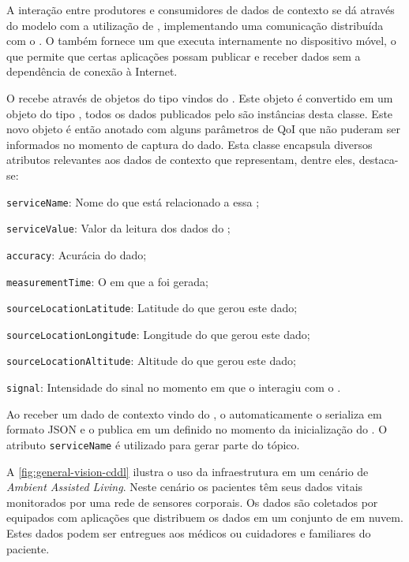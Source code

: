 A interação entre produtores e consumidores de dados de contexto se dá através do modelo \pubsub com a utilização de \brokers, implementando uma comunicação distribuída com o \mqtt. O \cddl também fornece um \ubroker que executa internamente no dispositivo móvel, o que permite que certas aplicações possam publicar e receber dados sem a dependência de conexão à Internet.

O \cddl recebe através de \eventbus objetos do tipo \sensordata vindos do \stwopa.
Este objeto é convertido em um objeto do tipo \msg, todos os dados publicados pelo \cddl são instâncias desta classe.
Este novo objeto é então anotado com alguns parâmetros de QoI que não puderam ser informados no momento de captura do dado.
Esta classe encapsula diversos atributos relevantes aos dados de contexto que representam, dentre eles, destaca-se:

\begin{alineas}
	\item \texttt{serviceName}: Nome do \smartobj que está relacionado a essa \msg;

	\item \texttt{serviceValue}: Valor da leitura dos dados do \smartobj;

	\item \texttt{accuracy}: Acurácia do dado;

	\item \texttt{measurementTime}: O \timestamp em que a \msg foi gerada;

	\item \texttt{sourceLocationLatitude}: Latitude do \mhub que gerou este dado;

	\item \texttt{sourceLocationLongitude}: Longitude do \mhub que gerou este dado;

	\item \texttt{sourceLocationAltitude}: Altitude do \mhub que gerou este dado;

	\item \texttt{signal}: Intensidade do sinal no momento em que o \smartobj interagiu com o \stwopa.
\end{alineas}

Ao receber um dado de contexto vindo do \stwopa, o \cddl automaticamente o serializa em formato JSON e o publica em um \broker \mqtt definido no momento da inicialização do \middleware. 
O atributo \texttt{serviceName} é utilizado para gerar parte do tópico.

A \autoref{fig:general-vision-cddl} ilustra o uso da infraestrutura \mhubcddl em um cenário de \textit{Ambient Assisted Living}. Neste cenário os pacientes têm seus dados vitais monitorados por uma rede de sensores corporais.
Os dados são coletados por \smartphones equipados com aplicações \mhubcddl que distribuem os dados em um conjunto de \brokers em nuvem.  
Estes dados podem ser entregues aos médicos ou cuidadores e familiares do paciente.

